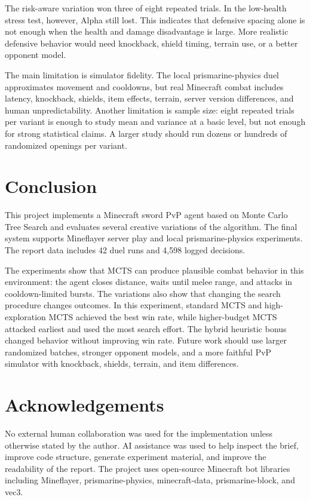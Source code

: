 \documentclass[11pt]{article}
\begin{document}
The risk-aware variation won three of eight repeated trials. In the low-health stress test, however, Alpha still lost. This indicates that defensive spacing alone is not enough when the health and damage disadvantage is large. More realistic defensive behavior would need knockback, shield timing, terrain use, or a better opponent model.

The main limitation is simulator fidelity. The local prismarine-physics duel approximates movement and cooldowns, but real Minecraft combat includes latency, knockback, shields, item effects, terrain, server version differences, and human unpredictability. Another limitation is sample size: eight repeated trials per variant is enough to study mean and variance at a basic level, but not enough for strong statistical claims. A larger study should run dozens or hundreds of randomized openings per variant.

\section{Conclusion}

This project implements a Minecraft sword PvP agent based on Monte Carlo Tree Search and evaluates several creative variations of the algorithm. The final system supports Mineflayer server play and local prismarine-physics experiments. The report data includes 42 duel runs and 4,598 logged decisions.

The experiments show that MCTS can produce plausible combat behavior in this environment: the agent closes distance, waits until melee range, and attacks in cooldown-limited bursts. The variations also show that changing the search procedure changes outcomes. In this experiment, standard MCTS and high-exploration MCTS achieved the best win rate, while higher-budget MCTS attacked earliest and used the most search effort. The hybrid heuristic bonus changed behavior without improving win rate. Future work should use larger randomized batches, stronger opponent models, and a more faithful PvP simulator with knockback, shields, terrain, and item differences.

\section*{Acknowledgements}

No external human collaboration was used for the implementation unless otherwise stated by the author. AI assistance was used to help inspect the brief, improve code structure, generate experiment material, and improve the readability of the report. The project uses open-source Minecraft bot libraries including Mineflayer, prismarine-physics, minecraft-data, prismarine-block, and vec3.
\end{document}
